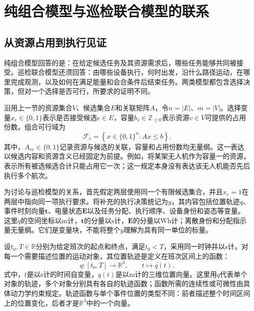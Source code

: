 \section{纯组合模型与巡检联合模型的联系}
\label{sec:01_03}

\subsection{从资源占用到执行见证}

纯组合模型回答的是：在给定候选任务及其资源需求后，哪些任务能够共同被接受。巡检联合模型还须回答：由哪些设备执行，何时出发，沿什么路径运动，在哪里完成观测，以及如何在满足能量和会合条件后结束任务。两类模型都包含选择决策，但对一个选择是否可行，所要求的证明不同。

沿用上一节的资源集合$V$、候选集合$E$和关联矩阵$A$，令$n=|E|$、$m=|V|$。选择变量$x_e\in\{0,1\}$表示是否接受候选$e\in E$，容量$b_v\in\mathbb Z_{\geq0}$表示资源$v\in V$可提供的占用份数。组合可行域为
\begin{equation}
 \mathcal F_{\mathrm c}
 =\left\{x\in\{0,1\}^{n}:Ax\leq b\right\}.
 \label{s0103:combinatorial_domain}
\end{equation}
其中，$A_{ve}\in\{0,1\}$记录资源与候选的关联，容量和占用份数均无量纲。这一表达以候选内容和资源含义已经固定为前提。例如，将某架无人机作为容量一的资源，表示所有被选候选合计只能占用它一次；这一规定本身没有表达该无人机能否先后执行多个航次。

为讨论与巡检模型的关系，首先假定两层使用同一个有限候选集合，并且$x_e=1$在两层中指向同一项执行要求。将补充的执行决策统记为$y$，其内容包括位置轨迹$q$、事件时刻向量$\boldsymbol t$、电量状态$\boldsymbol E$以及任务分配、执行顺序、设备身份和姿态等变量。这里$q$的空间坐标以$\mathrm m$计，$\boldsymbol t$的分量以$\mathrm s$计，$\boldsymbol E$的分量以$\mathrm{Wh}$计；离散身份和分配指示量无量纲。它们是变量块，不能将整个$y$理解为具有同一单位的标量。

设$t_0,T\in\mathbb R$分别为给定班次的起点和终点，满足$t_0<T$，采用同一时钟并以$\mathrm s$计。对每一个需要描述位置的运动对象，其位置轨迹是定义在班次区间上的函数：
\begin{equation}
 q:[t_0,T]\longrightarrow\mathbb R^3,
 \qquad t\longmapsto q(t).
 \label{s0103:trajectory_type}
\end{equation}
式中，$t$是以$\mathrm s$计的时间自变量，$q(t)$是以$\mathrm m$计的三维位置向量。这里用$q$代表单个对象的轨迹，多个对象分别具有各自的轨迹函数；函数所需的连续性或可微性由具体动力学约束规定。轨迹函数与单个事件位置的类型不同：前者描述整个时间区间上的位置变化，后者才是$\mathbb R^3$中的一个向量。

